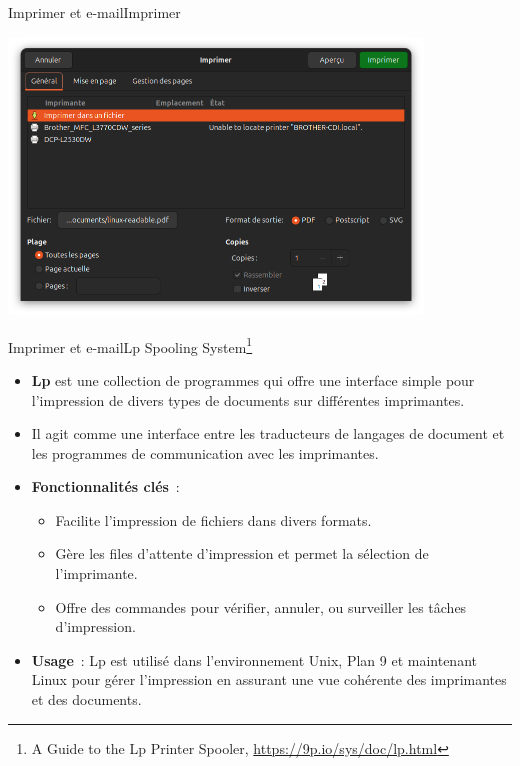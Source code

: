 \documentclass{beamer}
\begin{document}
    \begin{frame}{Imprimer et e-mail}{Imprimer}
        \begin{center}
            \includegraphics[width=11cm]{image/print-configuration}
        \end{center}
    \end{frame}

    \begin{frame}{Imprimer et e-mail}{Lp Spooling System\footnote{A Guide to the Lp Printer Spooler, \url{https://9p.io/sys/doc/lp.html}}}
        \begin{itemize}
            \item \textbf{Lp} est une collection de programmes qui offre une interface simple pour l'impression de divers types de documents sur différentes imprimantes.
            \item Il agit comme une interface entre les traducteurs de langages de document et les programmes de communication avec les imprimantes.
            \item \textbf{Fonctionnalités clés}~:
            \begin{itemize}
                \item Facilite l'impression de fichiers dans divers formats.
                \item Gère les files d'attente d'impression et permet la sélection de l'imprimante.
                \item Offre des commandes pour vérifier, annuler, ou surveiller les tâches d'impression.
            \end{itemize}
            \item \textbf{Usage}~: Lp est utilisé dans l'environnement Unix, Plan 9 et maintenant Linux pour gérer l'impression en assurant une vue cohérente des imprimantes et des documents.
        \end{itemize}
    \end{frame}
\end{document}
